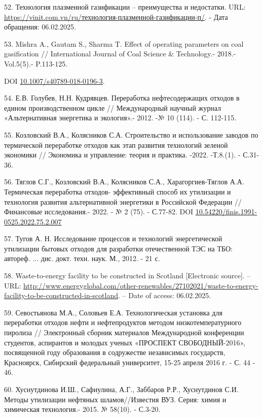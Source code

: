 52. Технология плазменной газификации -- преимущества и недостатки. URL:
\url{https://vinit.com.vn/ru/технология-плазменной-газификации-п/}. -
Дата обращения: 06.02.2025.

53. Mishra A., Gautam S., Sharma T. Effect of operating parameters on
coal gasification // International Journal of Coal Science \&
Technology.- 2018.- Vol.5(5).- P.113-125.

DOI
\href{http://dx.doi.org/10.1007/s40789-018-0196-3}{10.1007/s40789-018-0196-3}.

54. Е.В. Голубев, Н.Н. Кудрявцев. Переработка нефтесодержащих отходов в
едином производственном цикле // Международный научный журнал
«Альтернативная энергетика и экология».- 2012. -№ 10 (114). - С.
112-115.

55. Козловский В.А., Колясников С.А. Строительство и использование
заводов по термической переработке отходов как этап развития технологий
зеленой экономики // Экономика и управление: теория и практика. -2022.
-Т.8.(1). - С.31-36.

56. Тяглов С.Г., Козловский В.А., Колясников С.А., Харагоргиев-Тяглов
А.А. Термическая переработка отходов- эффективный способ их утилизации и
технология развития альтернативной энергетики в Российской Федерации //
Финансовые исследования.- 2022. - № 2 (75). - С.77-82. DOI
\href{https://doi.org/10.54220/finis.1991-0525.2022.75.2.007}{10.54220/finis.1991-0525.2022.75.2.007}

57. Тугов А. Н. Исследование процессов и технологий энергетической
утилизации бытовых отходов для разработки отечественной ТЭС на ТБО:
автореф. ... дис. докт. техн. наук. М., 2012. - 21 с.

58. Waste-to-energy facility to be constructed in Scotland {[}Electronic
source{]}. -- URL:
\url{http://www.energyglobal.com/other-renewables/27102021/waste-to-energy-facility-to-be-constructed-in-scotland}.
-- Date of access: 06.02.2025.

59. Севостьянова М.А., Соловьев Е.А. Технологическая установка для
переработки отходов нефти и нефтепродуктов методом низкотемпературного
пиролиза // Электронный сборник материалов Международной конференции
студентов, аспирантов и молодых ученых «ПРОСПЕКТ СВОБОДНЫЙ-2016»,
посвященной году образования в содружестве независимых государств,
Красноярск, Сибирский федеральный университет, 15-25 апреля 2016 г. - С.
44 - 46.

60. Хуснутдинова И.Ш., Сафиулина, А.Г., Заббаров Р.Р., Хуснутдинов С.И.
Методы утилизации нефтя­ных шламов//Известия ВУЗ. Серия: химия и
химическая технология.- 2015. № 58(10). - С.3-20.

